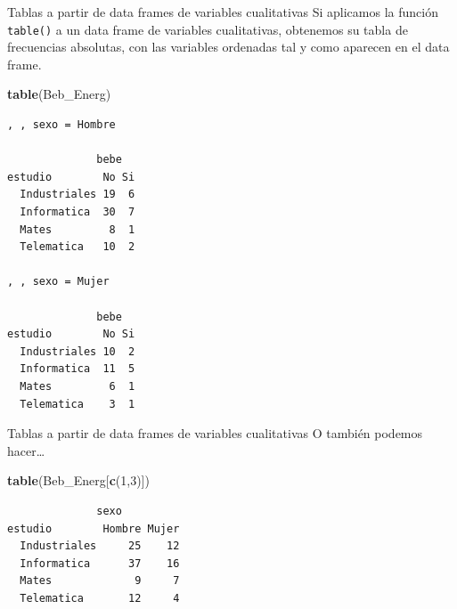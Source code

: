 \documentclass[
  ignorenonframetext,
  aspectratio=169]{beamer}
\newenvironment{Shaded}{\begin{snugshade}}{\end{snugshade}}
\newcommand{\DecValTok}[1]{\textcolor[rgb]{0.00,0.00,0.81}{#1}}
\newcommand{\FunctionTok}[1]{\textcolor[rgb]{0.13,0.29,0.53}{\textbf{#1}}}
\newcommand{\NormalTok}[1]{#1}
\begin{document}
\begin{frame}[fragile]{Tablas a partir de data frames de variables
cualitativas}
\label{tablas-a-partir-de-data-frames-de-variables-cualitativas-7}
Si aplicamos la función \texttt{table()} a un data frame de variables
cualitativas, obtenemos su tabla de frecuencias absolutas, con las
variables ordenadas tal y como aparecen en el data frame.

\begin{Shaded}
\begin{Highlighting}[]
\FunctionTok{table}\NormalTok{(Beb\_Energ)}
\end{Highlighting}
\end{Shaded}

\begin{verbatim}
, , sexo = Hombre

              bebe
estudio        No Si
  Industriales 19  6
  Informatica  30  7
  Mates         8  1
  Telematica   10  2

, , sexo = Mujer

              bebe
estudio        No Si
  Industriales 10  2
  Informatica  11  5
  Mates         6  1
  Telematica    3  1
\end{verbatim}
\end{frame}

\begin{frame}[fragile]{Tablas a partir de data frames de variables
cualitativas}
\label{tablas-a-partir-de-data-frames-de-variables-cualitativas-8}
O también podemos hacer\ldots{}

\begin{Shaded}
\begin{Highlighting}[]
\FunctionTok{table}\NormalTok{(Beb\_Energ[}\FunctionTok{c}\NormalTok{(}\DecValTok{1}\NormalTok{,}\DecValTok{3}\NormalTok{)])}
\end{Highlighting}
\end{Shaded}

\begin{verbatim}
              sexo
estudio        Hombre Mujer
  Industriales     25    12
  Informatica      37    16
  Mates             9     7
  Telematica       12     4
\end{verbatim}
\end{frame}
\end{document}
